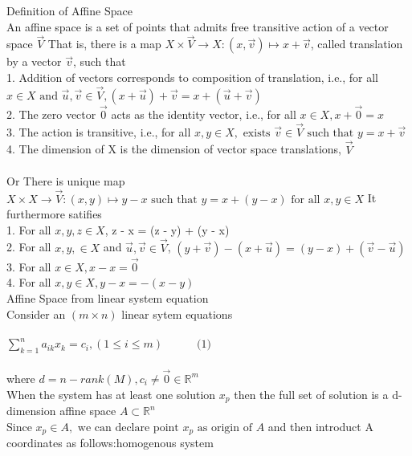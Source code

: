 \documentclass{book}
\begin{document}
\pagebreak
Definition of Affine Space\\
An affine space is a set of points that admits free transitive action of a vector space $\vec{V}$ That is, there is a map $X \times \vec{V} \rightarrow X:(x, \vec{v}) \mapsto x + \vec{v}$, called translation by a vector $\vec{v}$, such that\\
1. Addition of vectors corresponds to composition of translation, i.e., for all $x \in X \text{ and } \vec{u}, \vec{v} \in \vec{V}, (x + \vec{u}) + \vec{v} = x + (\vec{u} + \vec{v})$\\ 
2. The zero vector $\vec{0}$ acts as the identity vector, i.e., for all $x \in X, x + \vec{0} = x$\\
3. The action is transitive, i.e., for all $x, y \in X, \text{ exists } \vec{v} \in \vec{V} \text{ such that } y = x + \vec{v}$\\
4. The dimension of X is the dimension of vector space translations, $\vec{V}$\\\\
Or There is unique map\\
$X \times X \rightarrow \vec{V}:(x, y) \mapsto y - x \text{ such that } y = x + (y - x) \text{ for all }x, y \in X$
It furthermore satifies\\ 
1. For all $x, y, z \in X$, z - x = (z - y) + (y - x)\\
2. For all $x, y, \in X$ and $\vec{u}, \vec{v} \in \vec{V}$, $ (y + \vec{v}) - (x + \vec{u}) = (y - x) + (\vec{v} - \vec{u})$\\
3. For all $x \in X, x - x = \vec{0}$\\
4. For all $x, y \in X, y - x = -(x - y)$\\

Affine Space from linear system equation\\
Consider an $(m \times n)$ linear sytem equations\\\\
$\sum_{k=1}^{n} a_{i k} x_{k} = c_{i}, (1 \leq i \leq m) \quad\quad\quad \text{(1)}$\\\\
where $d = n - rank(M), c_{i} \ne \vec{0} \in \mathbb{R}^{m}$\\
When the system has at least one solution $x_{p}$ then the full set of solution is a d-dimension affine space
$A \subset \mathbb{R}^{n}$\\ 
Since $x_{p} \in A, \text{ we can declare point } x_{p} \text{ as origin of } A$ and then introduct A coordinates as follows:homogenous system\\
\end{document}

